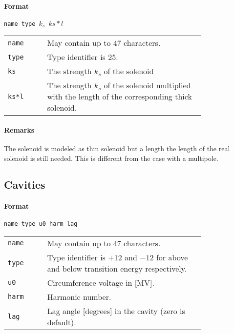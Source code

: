 \paragraph{Format} \texttt{name type $k_s$ $ks*l$}

\bigskip
\begin{tabular}{@{}lp{0.8\linewidth}}
    \texttt{name} & May contain up to 47 characters. \\
    \texttt{type} & Type identifier is 25. \\
    \texttt{ks}   & The strength $k_s$ of the solenoid \\
    \texttt{ks*l} & The strength $k_s$ of the solenoid multiplied with the length of the corresponding thick solenoid. \\
\end{tabular}

\paragraph{Remarks}
The solenoid is modeled as thin solenoid but a length the length of the real solenoid is still needed. This is different from the case with a multipole.

\subsection{Cavities} \label{Cavities}

\paragraph{Format} \texttt{name type u0 harm lag}

\bigskip
\begin{tabular}{@{}lp{0.8\linewidth}}
    \texttt{name} & May contain up to 47 characters. \\
    \texttt{type} & Type identifier is $+12$ and $-12$ for above and below transition energy respectively. \\
    \texttt{u0}   & Circumference voltage in [MV]. \\
    \texttt{harm} & Harmonic number. \\
    \texttt{lag}  & Lag angle [degrees] in the cavity (zero is default).
\end{tabular}

